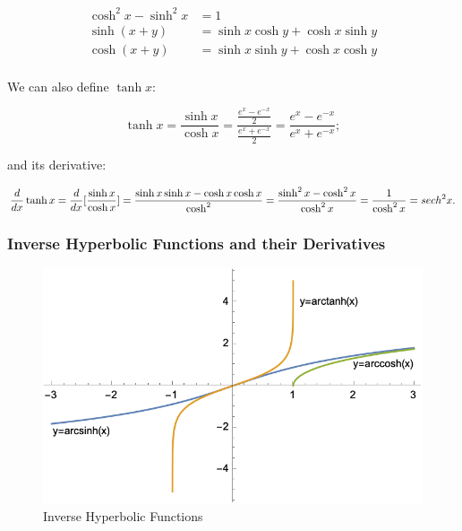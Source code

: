 \documentclass[12pt]{article}
\begin{document}
\begin{equation}
    \begin{split}
        \cosh^2 x - \sinh^2 x &= 1\\
        \sinh(x+y) &= \sinh x \cosh y + \cosh x \sinh y\\
        \cosh(x+y) &= \sinh x \sinh y + \cosh x \cosh y\\
    \end{split}
\end{equation}

We can also define $\tanh x$:

$$\tanh x = \frac{\sinh x}{\cosh x} = \frac{\frac{e^x-e^{-x}}{2}}{\frac{e^x+e^{-x}}{2}}=\frac{e^x-e^{-x}}{e^x+e^{-x}};$$

and its derivative:


$$\frac{d}{dx} \tanh x = \frac{d}{dx} [\frac{\sinh x}{\cosh x}] = \frac{\sinh x \sinh x - \cosh x \cosh x}{\cosh^2} = \frac{\sinh^2 x - \cosh^2 x}{\cosh^2 x} = \frac{1}{\cosh^2 x} = sech^2 x.$$

\subsubsection{Inverse Hyperbolic Functions and their Derivatives}

\begin{figure}[!ht]
    \centering
    \includegraphics{misc/inversehyperbolic.png}
    \caption{Inverse Hyperbolic Functions}
    \label{inversehyperbolic}
\end{figure}
\end{document}
